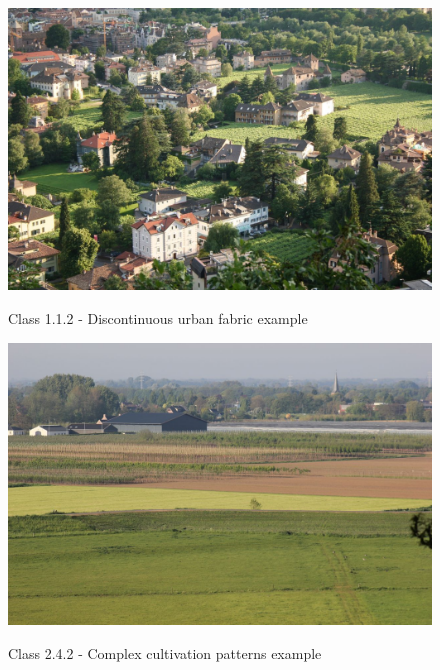 \begin{figure}[H]
	\caption{Class 1.1.2 - Discontinuous urban fabric example \cite{kosztra_green_suburbs_2024}}
	\centering
	\includegraphics[width=\textwidth]{chapter-images/5_1-eda/112_IT_IMG_3074_small.jpg}
	\label{fig:species_count}
\end{figure}

\begin{figure}[H]
	\caption{Class 2.4.2 - Complex cultivation patterns example \cite{hazeu_complex_2024}}
	\centering
	\includegraphics[width=\textwidth]{chapter-images/5_1-eda/242_NL_GH_IMG_2743_small.JPG}
	\label{fig:species_count}
\end{figure}

